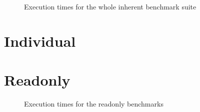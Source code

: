 \documentclass[12pt]{article}
\begin{document}
\MacroTableSummary

\MacroTableOverall

\begin{figure}
\begin{center}
\OverallPerfComparisonPlot
\end{center}
\vspace*{-5pt}
\caption{Execution times for the whole inherent benchmark suite}
\label{fig:perf-overview}
\end{figure}

\OverallTableSummary

\OverallTableOverall

\section{Individual}

\MopTableSummary

\MegamorphicTableSummary

\MopTableOverall

\MegaTableOverall

\section{Readonly}
\begin{figure}[ht]
\begin{center}
\ReadonlyPerfComparisonPlot
\end{center}
\vspace*{-5pt}
\caption{Execution times for the readonly benchmarks}
\label{fig:perf-overview}
\end{figure}

\ReadonlyTableSummary
\end{document}
